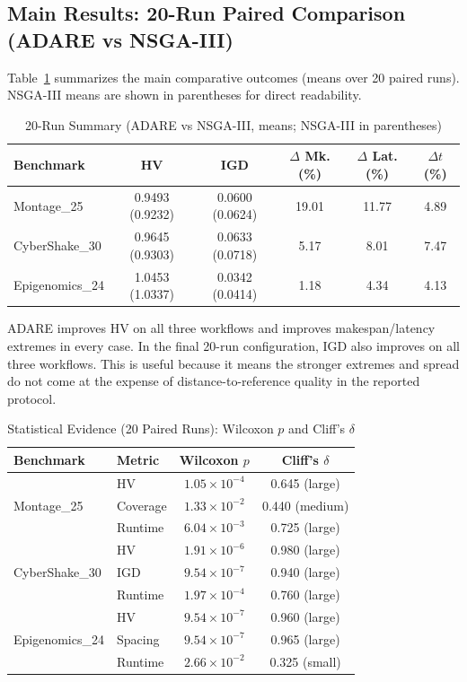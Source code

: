 \documentclass[runningheads]{llncs}
\begin{document}
\subsection{Main Results: 20-Run Paired Comparison (ADARE vs NSGA-III)}
Table~\ref{tab:main20} summarizes the main comparative outcomes (means over 20 paired runs). NSGA-III means are shown in parentheses for direct readability.

\begin{table}[t]
\caption{20-Run Summary (ADARE vs NSGA-III, means; NSGA-III in parentheses)}
\label{tab:main20}
\centering
\small
\begin{tabular}{@{}lccccc@{}}
\toprule
Benchmark & HV & IGD & $\Delta$ Mk. (\%) & $\Delta$ Lat. (\%) & $\Delta t$ (\%) \\
\midrule
Montage\_25 & 0.9493 (0.9232) & 0.0600 (0.0624) & 19.01 & 11.77 & 4.89 \\
CyberShake\_30 & 0.9645 (0.9303) & 0.0633 (0.0718) & 5.17 & 8.01 & 7.47 \\
Epigenomics\_24 & 1.0453 (1.0337) & 0.0342 (0.0414) & 1.18 & 4.34 & 4.13 \\
\bottomrule
\end{tabular}
\end{table}

ADARE improves HV on all three workflows and improves makespan/latency extremes in every case. In the final 20-run configuration, IGD also improves on all three workflows. This is useful because it means the stronger extremes and spread do not come at the expense of distance-to-reference quality in the reported protocol.

\begin{table}[t]
\caption{Statistical Evidence (20 Paired Runs): Wilcoxon $p$ and Cliff's $\delta$}
\label{tab:stats20}
\centering
\scriptsize
\begin{tabular}{@{}l l c c@{}}
\toprule
Benchmark & Metric & Wilcoxon $p$ & Cliff's $\delta$ \\
\midrule
\multirow{3}{*}{Montage\_25}
& HV & $1.05\times10^{-4}$ & 0.645 (large) \\
& Coverage & $1.33\times10^{-2}$ & 0.440 (medium) \\
& Runtime & $6.04\times10^{-3}$ & 0.725 (large) \\
\midrule
\multirow{3}{*}{CyberShake\_30}
& HV & $1.91\times10^{-6}$ & 0.980 (large) \\
& IGD & $9.54\times10^{-7}$ & 0.940 (large) \\
& Runtime & $1.97\times10^{-4}$ & 0.760 (large) \\
\midrule
\multirow{3}{*}{Epigenomics\_24}
& HV & $9.54\times10^{-7}$ & 0.960 (large) \\
& Spacing & $9.54\times10^{-7}$ & 0.965 (large) \\
& Runtime & $2.66\times10^{-2}$ & 0.325 (small) \\
\bottomrule
\end{tabular}
\end{table}
\end{document}
